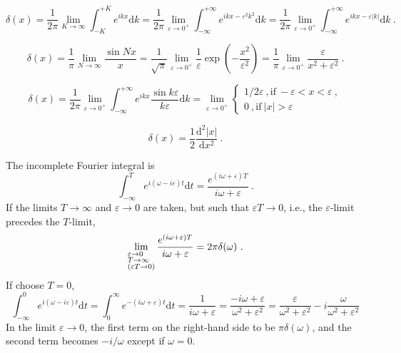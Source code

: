 \documentclass[12pt,a4paper]{article}
\newcommand{\dif}{\mathrm{d}}
\begin{document}
\begin{equation}
\delta(x) = \dfrac{1}{2\pi} \lim_{K \rightarrow \infty} \int_{-K}^{+K} e^{ikx} \dif k = \dfrac{1}{2\pi} \lim_{\varepsilon \rightarrow 0^+} \int_{-\infty}^{+\infty} e^{ikx-\varepsilon^2 k^2 } \dif k = \dfrac{1}{2\pi} \lim_{\varepsilon \rightarrow 0^+} \int_{-\infty}^{+\infty} e^{ikx-\varepsilon |k| } \dif k ~.
\end{equation}

\begin{equation}
\delta(x) = \dfrac{1}{\pi} \lim_{N \rightarrow \infty} \dfrac{\sin Nx}{x} = \dfrac{1}{\sqrt{\pi}} \lim_{\varepsilon \rightarrow 0^+} \dfrac{1}{\varepsilon} \exp \left(-\dfrac{x^2}{\varepsilon^2} \right) = \dfrac{1}{\pi} \lim_{\varepsilon \rightarrow 0^+} \dfrac{\varepsilon}{x^2 + \varepsilon^2} ~.
\end{equation}

\begin{equation}
\delta(x) = \dfrac{1}{2\pi} \lim_{\varepsilon \rightarrow 0^+} \int_{-\infty}^{+\infty} e^{ikx} \dfrac{\sin k\varepsilon}{k \varepsilon} \dif k = \lim_{\varepsilon \rightarrow 0^+} 
\begin{cases}
1/2\varepsilon ~,  \text{if} ~-\varepsilon < x < \varepsilon ~, \\
0 ~, \text{if} ~|x| > \varepsilon
\end{cases}
\end{equation}

\begin{equation}
\delta(x) = \dfrac{1}{2} \dfrac{\dif^2 |x|}{\dif x^2}  ~.
\end{equation}

The incomplete Fourier integral is
\begin{equation}
\int_{-\infty}^{T} e^{i(\omega -i\varepsilon) t} \dif t = \dfrac{e^{(i\omega +\varepsilon) T}}{i\omega +\varepsilon} ~.
\end{equation}
If the limits $T \rightarrow \infty$ and $\varepsilon \rightarrow 0$ are taken, but such that $\varepsilon T \rightarrow 0$, i.e., the $\varepsilon$-limit precedes the $T$-limit,
\begin{equation}
\lim_{\begin{subarray}{}
   \varepsilon \rightarrow 0 \\
    T \rightarrow \infty \\
    (\varepsilon T \rightarrow 0) 
  \end{subarray}} \dfrac{e^{(i\omega +\varepsilon) T}}{i\omega +\varepsilon}  = 2\pi \delta(\omega) ~.
\end{equation}
If choose $T = 0$, 
\begin{equation}
\int_{-\infty}^{0} e^{i(\omega -i\varepsilon) t} \dif t = \int_0^{\infty} e^{-(i\omega +\varepsilon) t} \dif t = \dfrac{1}{i\omega +\varepsilon} = \dfrac{-i\omega +\varepsilon}{\omega^2 +\varepsilon^2} = \dfrac{\varepsilon}{\omega^2 +\varepsilon^2} - i\dfrac{\omega }{\omega^2 +\varepsilon^2}
\end{equation}
In the limit $\varepsilon \rightarrow 0$,  the first term on the right-hand side to be $\pi \delta(\omega)$, and the second term becomes $-i/\omega$ except if $\omega = 0$.
\end{document}
